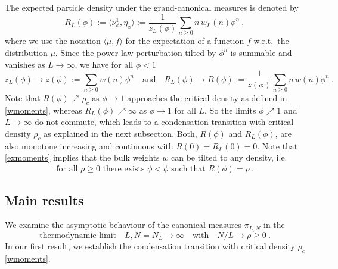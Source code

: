 \documentclass[pdflatex,sn-mathphys-num]{sn-jnl}%
\theoremstyle{thmstyleone}%
\theoremstyle{thmstyletwo}%
\theoremstyle{thmstylethree}%
\begin{document}
The expected particle density under the grand-canonical measures is denoted by
\begin{equation}\label{rl}
    R_L (\phi ):=\langle\nu_\phi^1 ,\eta_x \rangle :=\frac{1}{z_L (\phi )}\sum_{n\geq 0} n\, w_L (n)\phi^n \ ,
\end{equation}
where we use the notation $\langle\mu ,f\rangle$ for the expectation of a function $f$ w.r.t.\ the distribution $\mu$. Since the power-law perturbation tilted by $\phi^n$ is summable and vanishes as $L\to\infty$, we have for all $\phi <1$
\begin{equation}\label{zrlim}
z_L (\phi )\to z(\phi ):=\sum_{n\geq 0} w(n)\phi^n \quad\mbox{and}\quad R_L (\phi )\to R(\phi ):=\frac{1}{z(\phi )}\sum_{n\geq 0} n\, w(n)\phi^n \ .    
\end{equation}
Note that $R(\phi )\nearrow\rho_c$ as $\phi\to 1$ approaches the critical density as defined in \eqref{wmoments}, whereas $R_L (\phi )\nearrow\infty$ as $\phi\to 1$ for all $L$. So the limits $\phi\nearrow 1$ and $L\to\infty$ do not commute, which leads to a condensation transition with critical density $\rho_c$ as explained in the next subsection. Both, $R(\phi )$ and $R_L (\phi )$, are also monotone increasing and continuous with $R(0)=R_L (0)=0$. 
Note that \eqref{exmoments} implies that the bulk weights $w$ can be tilted to any density, i.e.
\begin{equation}\label{tilt}
\mbox{for all }\rho\geq 0\mbox{ there exists }\phi <\bar\phi \mbox{ such that }R(\phi )=\rho\ .    
\end{equation}

\bigskip
\subsection{Main results}

We examine the asymptotic behaviour of the canonical measures $\pi_{L,N}$ in the
\begin{equation}\label{thermo}
    \mbox{thermodynamic limit}\quad L,N=N_L \to\infty\quad\mbox{with}\quad N/L\to\rho\geq 0\ .
\end{equation}
In our first result, we establish the condensation transition with critical density $\rho_c$ \eqref{wmoments}.
\end{document}
